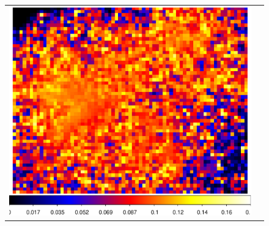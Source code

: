 \documentclass[a4j]{jarticle}%
\begin{document}
\begin{figure}[H]
  \begin{center}
  \begin{tabular}{cc}
  
  \begin{minipage}{0.5\hsize}
  \begin{center}
  \includegraphics[scale=0.45]{./Si_mean_std.eps}
  \end{center}
  \end{minipage}
  

\end{tabular}
\end{center}
\end{figure}
\end{document}
